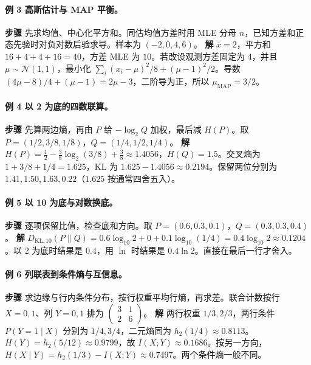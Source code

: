 \documentclass[UTF8,a4paper,zihao=-4,fontset=fandol]{ctexrep}
\begin{document}
\paragraph{例 3 高斯估计与 MAP 平衡。}
\textbf{步骤} 先求均值、中心化平方和。同估均值方差时用 MLE 分母 \(n\)，已知方差和正态先验时对负对数后验求导。样本为 \((-2,0,4,6)\)。
\textbf{解} \(\bar x=2\)，平方和 \(16+4+4+16=40\)，方差 MLE 为 \(10\)。若改设观测方差固定为 \(4\)，并且 \(\mu\sim\mathcal N(1,1)\)，最小化 \(\sum_i(x_i-\mu)^2/8+(\mu-1)^2/2\)。导数 \((4\mu-8)/4+(\mu-1)=2\mu-3\)，二阶导为正，所以 \(\mu_{\mathrm{MAP}}=3/2\)。

\paragraph{例 4 以 2 为底的四数联算。}
\textbf{步骤} 先算两边熵，再由 \(P\) 给 \(-\log_2 Q\) 加权，最后减 \(H(P)\)。取 \(P=(1/2,3/8,1/8)\)，\(Q=(1/4,1/2,1/4)\)。
\textbf{解} \(H(P)=\tfrac12-\tfrac38\log_2(3/8)+\tfrac38\approx1.4056\)，\(H(Q)=1.5\)。交叉熵为 \(1+3/8+1/4=1.625\)，KL 为 \(1.625-1.4056\approx0.2194\)。保留两位分别为 \(1.41,1.50,1.63,0.22\)（\(1.625\) 按通常四舍五入）。

\paragraph{例 5 以 10 为底与对数换底。}
\textbf{步骤} 逐项保留比值，检查底和方向。取 \(P=(0.6,0.3,0.1)\)，\(Q=(0.3,0.3,0.4)\)。
\textbf{解} \(D_{\mathrm{KL},10}(P\|Q)=0.6\log_{10}2+0+0.1\log_{10}(1/4)=0.4\log_{10}2\approx0.1204\)。以 2 为底时结果是 \(0.4\)，用 \(\ln\) 时结果是 \(0.4\ln 2\)。直接在最后一行才舍入。

\paragraph{例 6 列联表到条件熵与互信息。}
\textbf{步骤} 求边缘与行内条件分布，按行权重平均行熵，再求差。联合计数按行 \(X=0,1\)、列 \(Y=0,1\) 排为 \(\begin{pmatrix}3&1\\2&6\end{pmatrix}\)。
\textbf{解} 两行权重 \(1/3,2/3\)，两行条件 \(P(Y=1\mid X)\) 分别为 \(1/4,3/4\)，二元熵同为 \(h_2(1/4)\approx0.8113\)。\(H(Y)=h_2(5/12)\approx0.9799\)，故 \(I(X;Y)\approx0.1686\)。按另一方向，\(H(X\mid Y)=h_2(1/3)-I(X;Y)\approx0.7497\)。两个条件熵一般不同。
\end{document}
